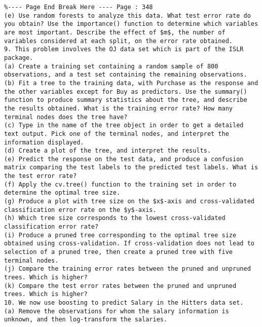 \documentclass[10pt]{article}
\begin{document}
\begin{verbatim}
%---- Page End Break Here ---- Page : 348
(e) Use random forests to analyze this data. What test error rate do you obtain? Use the importance() function to determine which variables are most important. Describe the effect of $m$, the number of variables considered at each split, on the error rate obtained.
9. This problem involves the OJ data set which is part of the ISLR package.
(a) Create a training set containing a random sample of 800 observations, and a test set containing the remaining observations.
(b) Fit a tree to the training data, with Purchase as the response and the other variables except for Buy as predictors. Use the summary() function to produce summary statistics about the tree, and describe the results obtained. What is the training error rate? How many terminal nodes does the tree have?
(c) Type in the name of the tree object in order to get a detailed text output. Pick one of the terminal nodes, and interpret the information displayed.
(d) Create a plot of the tree, and interpret the results.
(e) Predict the response on the test data, and produce a confusion matrix comparing the test labels to the predicted test labels. What is the test error rate?
(f) Apply the cv.tree() function to the training set in order to determine the optimal tree size.
(g) Produce a plot with tree size on the $x$-axis and cross-validated classification error rate on the $y$-axis.
(h) Which tree size corresponds to the lowest cross-validated classification error rate?
(i) Produce a pruned tree corresponding to the optimal tree size obtained using cross-validation. If cross-validation does not lead to selection of a pruned tree, then create a pruned tree with five terminal nodes.
(j) Compare the training error rates between the pruned and unpruned trees. Which is higher?
(k) Compare the test error rates between the pruned and unpruned trees. Which is higher?
10. We now use boosting to predict Salary in the Hitters data set.
(a) Remove the observations for whom the salary information is unknown, and then log-transform the salaries.


\end{verbatim}
\end{document}
